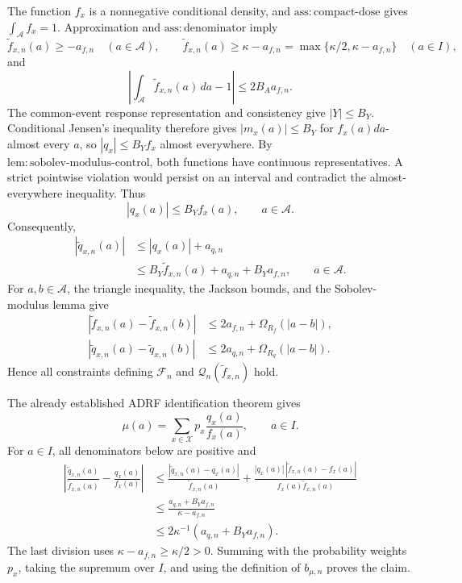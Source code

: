 The function \(f_x\) is a nonnegative conditional density, and \(\mathrm{ass{:}compact\text{-}dose}\) gives \(\int_{\mathcal A}f_x=1\). Approximation and \(\mathrm{ass{:}denominator}\) imply
\[
 \widetilde f_{x,n}(a)\ge-a_{f,n}\quad(a\in\mathcal A),
 \qquad
 \widetilde f_{x,n}(a)\ge\kappa-a_{f,n}
 =\max\{\kappa/2,\kappa-a_{f,n}\}\quad(a\in I),
\]
and
\[
 \left|\int_{\mathcal A}\widetilde f_{x,n}(a)\,da-1\right|
 \le2B_Aa_{f,n}.
\]
The common-event response representation and consistency give \(|Y|\le B_Y\). Conditional Jensen's inequality therefore gives \(|m_x(a)|\le B_Y\) for \(f_x(a)da\)-almost every \(a\), so \(|q_x|\le B_Yf_x\) almost everywhere. By \(\mathrm{lem{:}sobolev\text{-}modulus\text{-}control}\), both functions have continuous representatives. A strict pointwise violation would persist on an interval and contradict the almost-everywhere inequality. Thus
\[
 |q_x(a)|\le B_Yf_x(a),\qquad a\in\mathcal A.
\]
Consequently,
\[
 \begin{aligned}
 |\widetilde q_{x,n}(a)|
 &\le |q_x(a)|+a_{q,n}\\
 &\le B_Y\widetilde f_{x,n}(a)+a_{q,n}+B_Ya_{f,n},
 \qquad a\in\mathcal A.
 \end{aligned}
\]
For \(a,b\in\mathcal A\), the triangle inequality, the Jackson bounds, and the Sobolev-modulus lemma give
\[
 \begin{aligned}
 |\widetilde f_{x,n}(a)-\widetilde f_{x,n}(b)|
 &\le 2a_{f,n}+\Omega_{R_f}(|a-b|),\\
 |\widetilde q_{x,n}(a)-\widetilde q_{x,n}(b)|
 &\le 2a_{q,n}+\Omega_{R_q}(|a-b|).
 \end{aligned}
\]
Hence all constraints defining \(\mathscr F_n\) and \(\mathscr Q_n(\widetilde f_{x,n})\) hold.

The already established ADRF identification theorem gives
\[
 \mu(a)=\sum_{x\in\mathcal X}p_x\frac{q_x(a)}{f_x(a)},\qquad a\in I.
\]
For \(a\in I\), all denominators below are positive and
\[
 \begin{aligned}
 \left|\frac{\widetilde q_{x,n}(a)}{\widetilde f_{x,n}(a)}
       -\frac{q_x(a)}{f_x(a)}\right|
 &\le
 \frac{|\widetilde q_{x,n}(a)-q_x(a)|}{\widetilde f_{x,n}(a)}
 +\frac{|q_x(a)|\,|\widetilde f_{x,n}(a)-f_x(a)|}
 {f_x(a)\widetilde f_{x,n}(a)}\\
 &\le\frac{a_{q,n}+B_Ya_{f,n}}{\kappa-a_{f,n}}\\
 &\le2\kappa^{-1}(a_{q,n}+B_Ya_{f,n}).
 \end{aligned}
\]
The last division uses \(\kappa-a_{f,n}\ge\kappa/2>0\). Summing with the probability weights \(p_x\), taking the supremum over \(I\), and using the definition of \(b_{\mu,n}\) proves the claim.

